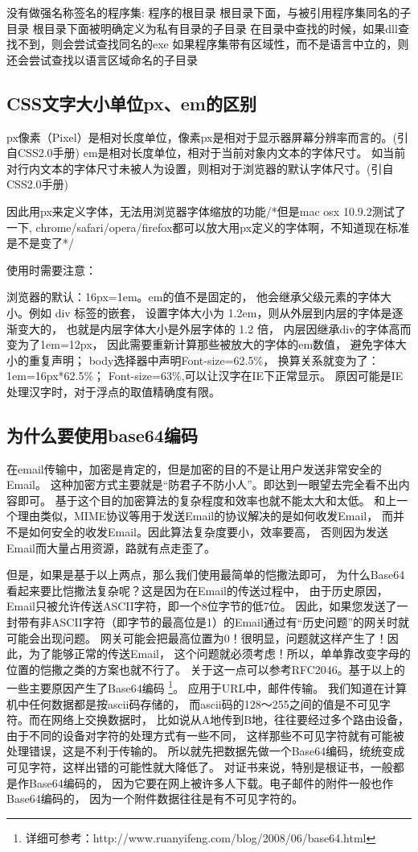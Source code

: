 \documentclass{book}
\begin{document}
没有做强名称签名的程序集:
程序的根目录
根目录下面，与被引用程序集同名的子目录
根目录下面被明确定义为私有目录的子目录
在目录中查找的时候，如果dll查找不到，则会尝试查找同名的exe
如果程序集带有区域性，而不是语言中立的，则还会尝试查找以语言区域命名的子目录

\subsection{CSS文字大小单位px、em的区别}

px像素（Pixel）是相对长度单位，像素px是相对于显示器屏幕分辨率而言的。(引自CSS2.0手册)
em是相对长度单位，相对于当前对象内文本的字体尺寸。
如当前对行内文本的字体尺寸未被人为设置，则相对于浏览器的默认字体尺寸。(引自CSS2.0手册)

因此用px来定义字体，无法用浏览器字体缩放的功能/*但是mac osx 10.9.2测试了一下,
chrome/safari/opera/firefox都可以放大用px定义的字体啊，不知道现在标准是不是变了*/

使用时需要注意：

浏览器的默认：16px=1em。em的值不是固定的，
他会继承父级元素的字体大小。例如 div 标签的嵌套，
设置字体大小为 1.2em，则从外层到内层的字体是逐渐变大的，
也就是内层字体大小是外层字体的 1.2 倍，
内层因继承div的字体高而变为了1em=12px，
因此需要重新计算那些被放大的字体的em数值，
避免字体大小的重复声明；
body选择器中声明Font-size=62.5\%，
换算关系就变为了：1em=16px*62.5\%；
Font-size=63\%,可以让汉字在IE下正常显示。
原因可能是IE处理汉字时，对于浮点的取值精确度有限。


\subsection{为什么要使用base64编码}

在email传输中，加密是肯定的，但是加密的目的不是让用户发送非常安全的Email。
这种加密方式主要就是“防君子不防小人”。即达到一眼望去完全看不出内容即可。
基于这个目的加密算法的复杂程度和效率也就不能太大和太低。
和上一个理由类似，MIME协议等用于发送Email的协议解决的是如何收发Email，
而并不是如何安全的收发Email。因此算法复杂度要小，效率要高，
否则因为发送Email而大量占用资源，路就有点走歪了。

但是，如果是基于以上两点，那么我们使用最简单的恺撒法即可，
为什么Base64看起来要比恺撒法复杂呢？这是因为在Email的传送过程中，
由于历史原因，Email只被允许传送ASCII字符，即一个8位字节的低7位。
因此，如果您发送了一封带有非ASCII字符（即字节的最高位是1）的Email通过有“历史问题”的网关时就可能会出现问题。
网关可能会把最高位置为0！很明显，问题就这样产生了！因此，为了能够正常的传送Email，
这个问题就必须考虑！所以，单单靠改变字母的位置的恺撒之类的方案也就不行了。
关于这一点可以参考RFC2046。基于以上的一些主要原因产生了Base64编码
\footnote{详细可参考：http://www.ruanyifeng.com/blog/2008/06/base64.html}。
应用于URL中，邮件传输。
我们知道在计算机中任何数据都是按ascii码存储的，
而ascii码的128～255之间的值是不可见字符。而在网络上交换数据时，
比如说从A地传到B地，往往要经过多个路由设备，由于不同的设备对字符的处理方式有一些不同，
这样那些不可见字符就有可能被处理错误，这是不利于传输的。
所以就先把数据先做一个Base64编码，统统变成可见字符，这样出错的可能性就大降低了。
对证书来说，特别是根证书，一般都是作Base64编码的，
因为它要在网上被许多人下载。电子邮件的附件一般也作Base64编码的，
因为一个附件数据往往是有不可见字符的。
\end{document}
